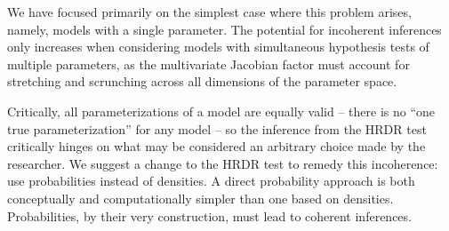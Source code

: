 \documentclass[9pt,twocolumn,twoside]{cidlab-draft}\templatetype{cidlab-invited}
\newcommand{\hdr}{HRDR}
\begin{document}
We have focused primarily on the simplest case where this problem arises, namely, models with a single parameter. The potential for incoherent inferences only increases when considering models with simultaneous hypothesis tests of multiple parameters, as the multivariate Jacobian factor must account for stretching and scrunching across all dimensions of the parameter space. 

Critically, all parameterizations of a model are equally valid -- there is no ``one true parameterization'' for any model -- so the inference from the \hdr{} test critically hinges on what may be considered an arbitrary choice made by the researcher. We suggest a change to the \hdr{} test to remedy this incoherence: use probabilities instead of densities. A direct probability approach is both conceptually and computationally simpler than one based on densities. Probabilities, by their very construction, must lead to coherent inferences. 


\end{document}
